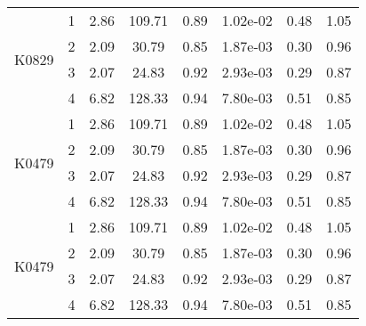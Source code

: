 \begin{longtable}{|c|c|c|c|c|c|c|c|}
\multirow{4}{*}{K0829} & 1 & 2.86 & 109.71 & 0.89 & 1.02e-02 & 0.48 & 1.05 \\
& 2 & 2.09 & 30.79 & 0.85 & 1.87e-03 & 0.30 & 0.96 \\
& 3 & 2.07 & 24.83 & 0.92 & 2.93e-03 & 0.29 & 0.87 \\
& 4 & 6.82 & 128.33 & 0.94& 7.80e-03 & 0.51 & 0.85 \\ \hline

\multirow{4}{*}{K0479} & 1 & 2.86 & 109.71 & 0.89 & 1.02e-02 & 0.48 & 1.05 \\
& 2 & 2.09 & 30.79 & 0.85 & 1.87e-03 & 0.30 & 0.96 \\
& 3 & 2.07 & 24.83 & 0.92 & 2.93e-03 & 0.29 & 0.87 \\
& 4 & 6.82 & 128.33 & 0.94& 7.80e-03 & 0.51 & 0.85 \\ \hline


\multirow{4}{*}{K0479} & 1 & 2.86 & 109.71 & 0.89 & 1.02e-02 & 0.48 & 1.05 \\
& 2 & 2.09 & 30.79 & 0.85 & 1.87e-03 & 0.30 & 0.96 \\
& 3 & 2.07 & 24.83 & 0.92 & 2.93e-03 & 0.29 & 0.87 \\
& 4 & 6.82 & 128.33 & 0.94& 7.80e-03 & 0.51 & 0.85 \\ \hline
\hline

\end{longtable}

